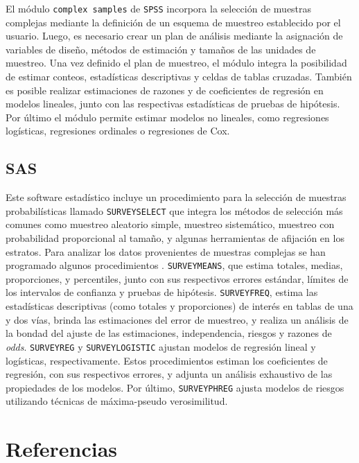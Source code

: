 \documentclass[
  12pt,
]{book}
\begin{document}
El módulo \texttt{complex\ samples} de \texttt{SPSS} \citep{IBM_2017} incorpora la selección de muestras complejas mediante la definición de un esquema de muestreo establecido por el usuario. Luego, es necesario crear un plan de análisis mediante la asignación de variables de diseño, métodos de estimación y tamaños de las unidades de muestreo. Una vez definido el plan de muestreo, el módulo integra la posibilidad de estimar conteos, estadísticas descriptivas y celdas de tablas cruzadas. También es posible realizar estimaciones de razones y de coeficientes de regresión en modelos lineales, junto con las respectivas estadísticas de pruebas de hipótesis. Por último el módulo permite estimar modelos no lineales, como regresiones logísticas, regresiones ordinales o regresiones de Cox.

\hypertarget{sas}{%
\section{SAS}\label{sas}}

Este software estadístico incluye un procedimiento para la selección de muestras probabilísticas llamado \texttt{SURVEYSELECT} que integra los métodos de selección más comunes como muestreo aleatorio simple, muestreo sistemático, muestreo con probabilidad proporcional al tamaño, y algunas herramientas de afijación en los estratos. Para analizar los datos provenientes de muestras complejas se han programado algunos procedimientos \citep{SAS_2017}. \texttt{SURVEYMEANS}, que estima totales, medias, proporciones, y percentiles, junto con sus respectivos errores estándar, límites de los intervalos de confianza y pruebas de hipótesis. \texttt{SURVEYFREQ}, estima las estadísticas descriptivas (como totales y proporciones) de interés en tablas de una y dos vías, brinda las estimaciones del error de muestreo, y realiza un análisis de la bondad del ajuste de las estimaciones, independencia, riesgos y razones de \emph{odds}. \texttt{SURVEYREG} y \texttt{SURVEYLOGISTIC} ajustan modelos de regresión lineal y logísticas, respectivamente. Estos procedimientos estiman los coeficientes de regresión, con sus respectivos errores, y adjunta un análisis exhaustivo de las propiedades de los modelos. Por último, \texttt{SURVEYPHREG} ajusta modelos de riesgos utilizando técnicas de máxima-pseudo verosimilitud.

\hypertarget{referencias}{%
\chapter*{Referencias}\label{referencias}}

  
\end{document}
